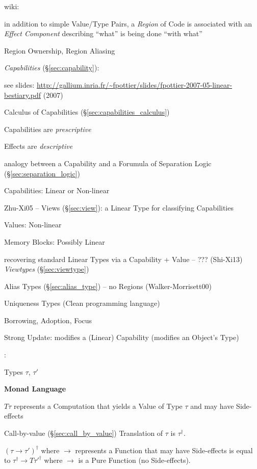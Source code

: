 wiki:

in addition to simple Value/Type Pairs, a \emph{Region} of Code is
associated with an \emph{Effect Component} describing ``what'' is
being done ``with what''

Region Ownership, Region Aliasing


\emph{Capabilities} (\S\ref{sec:capability}):

\fist see slides:
\url{http://gallium.inria.fr/~fpottier/slides/fpottier-2007-05-linear-bestiary.pdf}
(2007)

Calculus of Capabilities (\S\ref{sec:capabilities_calculus})

Capabilities are \emph{prescriptive}

Effects are \emph{descriptive}

analogy between a Capability and a Forumula of Separation Logic
(\S\ref{sec:separation_logic})

Capabilities: Linear or Non-linear

Zhu-Xi05 -- Views (\S\ref{sec:view}): a Linear Type for classifying
Capabilities

Values: Non-linear

Memory Blocks: Possibly Linear

recovering standard Linear Types via a Capability + Value --
??? (Shi-Xi13) \emph{Viewtypes} (\S\ref{sec:viewtype})

Alias Types (\S\ref{sec:alias_type}) -- no Regions
(Walker-Morrisett00)

Uniqueness Types (Clean programming language)

Borrowing, Adoption, Focus %

Strong Update: modifies a (Linear) Capability (modifies an Object's
Type)



\asterism


\cite{wadler-thiemann03}:

Types $\tau$, $\tau'$


\textbf{Monad Language}

$T \tau$ represents a Computation that yields a Value
of Type $\tau$ and may have Side-effects

Call-by-value (\S\ref{sec:call_by_value}) Translation of $\tau$ is
$\tau^\dag$.

$(\tau \rightarrow \tau')^\dag$ where $\rightarrow$ represents a
Function that may have Side-effects is equal to $\tau^\dag \rightarrow
T \tau'^\dag$ where $\rightarrow$ is a Pure Function (no Side-effects).

